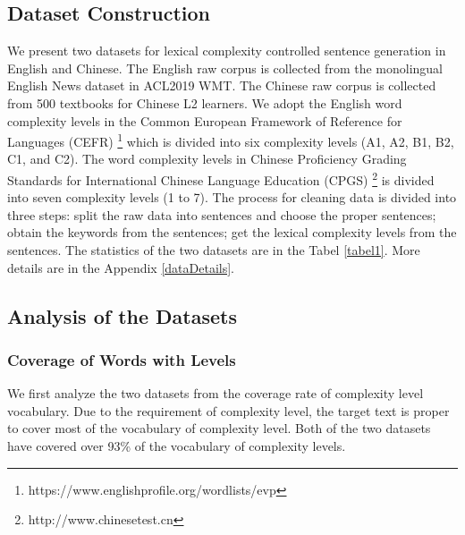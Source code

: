 \documentclass[11pt]{article}
\begin{document}
\subsection{Dataset Construction}
We present two datasets for lexical complexity controlled sentence generation in English and Chinese. The English raw corpus is collected from the monolingual English News dataset in ACL2019 WMT. The Chinese raw corpus is collected from 500 textbooks for Chinese L2 learners. We adopt the English word complexity levels in the Common European Framework of Reference for Languages (CEFR) \footnote{https://www.englishprofile.org/wordlists/evp} which is divided into six complexity levels (A1, A2, B1, B2, C1, and C2). The word complexity levels in Chinese Proficiency Grading Standards for International Chinese Language Education (CPGS) \footnote{http://www.chinesetest.cn} is divided into seven complexity levels (1 to 7). The process for cleaning data is divided into three steps: split the raw data into sentences and choose the proper sentences; obtain the keywords from the sentences; get the lexical complexity levels from the sentences. The statistics of the two datasets are in the Tabel \ref{tabel1}. More details are in the Appendix \ref{dataDetails}.



\subsection{Analysis of the Datasets}

\subsubsection{Coverage of Words with Levels}
We first analyze the two datasets from the coverage rate of complexity level vocabulary. Due to the requirement of complexity level, the target text is proper to cover most of the vocabulary of complexity level. Both of the two datasets have covered over 93\% of the vocabulary of complexity levels. 
\end{document}
